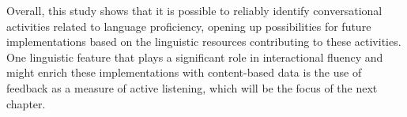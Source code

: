 Overall, this study shows that it is possible to reliably identify conversational activities related to language proficiency, opening up possibilities for future implementations based on the linguistic resources contributing to these activities. One linguistic feature that plays a significant role in interactional fluency and might enrich these implementations with content-based data is the use of feedback as a measure of active listening, which will be the focus of the next chapter.
